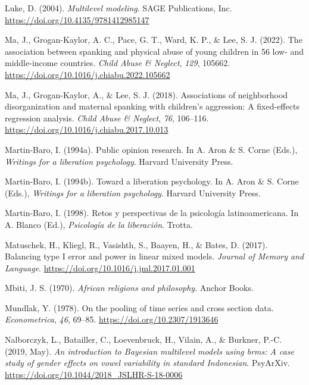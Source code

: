 \documentclass[
  letterpaper,
  DIV=11,
  numbers=noendperiod]{scrreprt}
\newlength{\cslhangindent}
\newlength{\cslentryspacingunit} %
\newenvironment{CSLReferences}[2] %
 {%
  \setlength{\parindent}{0pt}
  \ifodd #1
  \let\oldpar\par
  \def\par{\hangindent=\cslhangindent\oldpar}
  \fi
  \setlength{\parskip}{#2\cslentryspacingunit}
 }%
 {}
\begin{document}
\begin{CSLReferences}{1}{0}
\leavevmode{}%
Luke, D. (2004). \emph{Multilevel modeling}. SAGE Publications, Inc.
\url{https://doi.org/10.4135/9781412985147}

\leavevmode{}%
Ma, J., Grogan-Kaylor, A. C., Pace, G. T., Ward, K. P., \& Lee, S. J.
(2022). {The association between spanking and physical abuse of young
children in 56 low- and middle-income countries}. \emph{Child Abuse \&
Neglect}, \emph{129}, 105662.
\url{https://doi.org/10.1016/j.chiabu.2022.105662}

\leavevmode{}%
Ma, J., Grogan-Kaylor, A., \& Lee, S. J. (2018). Associations of
neighborhood disorganization and maternal spanking with children's
aggression: A fixed-effects regression analysis. \emph{Child Abuse \&
Neglect}, \emph{76}, 106--116.
\url{https://doi.org/10.1016/j.chiabu.2017.10.013}

\leavevmode{}%
Martin-Baro, I. (1994a). Public opinion research. In A. Aron \& S. Corne
(Eds.), \emph{Writings for a liberation psychology}. Harvard University
Press.

\leavevmode{}%
Martin-Baro, I. (1994b). Toward a liberation psychology. In A. Aron \&
S. Corne (Eds.), \emph{Writings for a liberation psychology}. Harvard
University Press.

\leavevmode{}%
Martin-Baro, I. (1998). {Retos y perspectivas de la psicología
latinoamericana}. In A. Blanco (Ed.), \emph{Psicología de la
liberación}. Trotta.

\leavevmode{}%
Matuschek, H., Kliegl, R., Vasishth, S., Baayen, H., \& Bates, D.
(2017). Balancing type {I} error and power in linear mixed models.
\emph{Journal of Memory and Language}.
\url{https://doi.org/10.1016/j.jml.2017.01.001}

\leavevmode{}%
Mbiti, J. S. (1970). \emph{African religions and philosophy}. Anchor
Books.

\leavevmode{}%
Mundlak, Y. (1978). On the pooling of time series and cross section
data. \emph{Econometrica}, \emph{46}, 69--85.
\url{https://doi.org/10.2307/1913646}

\leavevmode{}%
Nalborczyk, L., Batailler, C., Loevenbruck, H., Vilain, A., \& Burkner,
P.-C. (2019, May). \emph{An introduction to {B}ayesian multilevel models
using brms: A case study of gender effects on vowel variability in
standard {I}ndonesian}. PsyArXiv.
\url{https://doi.org/10.1044/2018_JSLHR-S-18-0006}


\end{CSLReferences}
\end{document}
